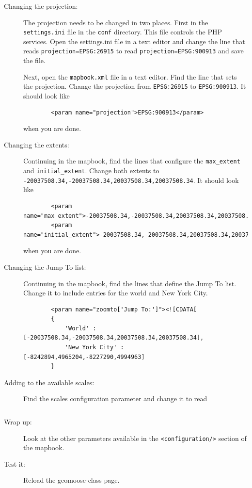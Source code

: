 \documentclass[letterpaper]{article}
\begin{document}
\begin{description}
\item[Changing the projection:] The projection needs to be changed in
  two places.  First in the \texttt{settings.ini} file in the
  \texttt{conf} directory.  This file controls the PHP services.  Open
  the settings.ini file in a text editor and change the line that
  reads \verb|projection=EPSG:26915| to read
  \verb|projection=EPSG:900913| and save the file.

  Next, open the \texttt{mapbook.xml} file in a text editor. Find the
  line that sets the projection.  Change the projection from
  \verb|EPSG:26915| to \verb|EPSG:900913|.  It should look like
  \begin{verbatim}
		<param name="projection">EPSG:900913</param>
  \end{verbatim}
  when you are done.
  
\item[Changing the extents:] Continuing in the mapbook, find the lines
  that configure the \verb|max_extent| and \verb|initial_extent|.
  Change both extents to \verb|-20037508.34,-20037508.34,20037508.34,20037508.34|.  It should look like
  \begin{verbatim}
		<param name="max_extent">-20037508.34,-20037508.34,20037508.34,20037508.34</param>
		<param name="initial_extent">-20037508.34,-20037508.34,20037508.34,20037508.34</param>
  \end{verbatim}
  when you are done.

\item[Changing the Jump To list:] Continuing in the mapbook, find the
  lines that define the Jump To list. Change it to include entries for
  the world and New York City.

\begin{verbatim}
		<param name="zoomto['Jump To:']"><![CDATA[
		{
			'World' : [-20037508.34,-20037508.34,20037508.34,20037508.34],
			'New York City' : [-8242894,4965204,-8227290,4994963]
		}
\end{verbatim}

\item[Adding to the available scales:] Find the scales configuration parameter and change it to read

\begin{verbatim}

\end{verbatim}

\item[Wrap up:] Look at the other parameters available in the
  \verb|<configuration/>| section of the mapbook.

\item[Test it:] Reload the geomoose-class page.
\end{description}
\end{document}
